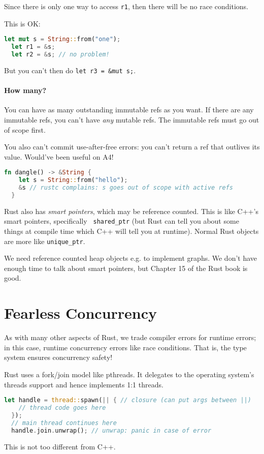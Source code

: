 Since there is only one way to access {\tt r1}, then there will be no race conditions.

This is OK:
\begin{lstlisting}[language=Rust]
  let mut s = String::from("one");
  let r1 = &s;
  let r2 = &s; // no problem!
\end{lstlisting}
But you can't then do {\tt let r3 = \&mut s;}.

\paragraph{How many?} You can have as many outstanding immutable refs as you want.
If there are any immutable refs, you can't have \emph{any} mutable refs. The immutable
refs must go out of scope first.

You also can't commit use-after-free errors: you can't return a ref that outlives
its value. Would've been useful on A4!
\begin{lstlisting}[language=Rust]
  fn dangle() -> &String {
    let s = String::from("hello");
    &s // rustc complains: s goes out of scope with active refs
  }
\end{lstlisting}

Rust also has \emph{smart pointers}, which may be reference
counted. This is like C++'s smart pointers, specifically {\tt
  shared\_ptr} (but Rust can tell you about some things at compile
time which C++ will tell you at runtime). Normal Rust objects are more
like {\tt unique\_ptr}.

We need reference counted heap objects e.g. to implement graphs. We don't have
enough time to talk about smart pointers, but Chapter 15 of the Rust book is good.

\section*{Fearless Concurrency}
As with many other aspects of Rust, we trade compiler errors for runtime
errors; in this case, runtime concurrency errors like race conditions.
That is, the type system ensures concurrency safety!

Rust uses a fork/join model like pthreads. It delegates to the operating
system's threads support and hence implements 1:1 threads.
\begin{lstlisting}[language=Rust]
  let handle = thread::spawn(|| { // closure (can put args between ||)
    // thread code goes here
  });
  // main thread continues here
  handle.join.unwrap(); // unwrap: panic in case of error
\end{lstlisting}
This is not too different from C++.


